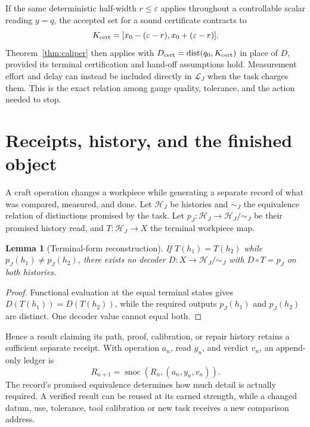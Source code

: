 \documentclass[11pt,letterpaper]{article}
\newtheorem{lemma}{Lemma}
\theoremstyle{definition}\newtheorem{definition}{Definition}
\newcommand{\Lag}{\mathscr L}
\newcommand{\dist}{\operatorname{dist}}
\newcommand{\snoc}{\operatorname{snoc}}
\begin{document}
If the same deterministic half-width $r\le\varepsilon$ applies throughout a controllable scalar reading $y=q$, the accepted set for a sound certificate contracts to
\[
K_{\rm cert}=[x_0-(\varepsilon-r),x_0+(\varepsilon-r)].
\]
Theorem~\ref{thm:caliper} then applies with $D_{\rm cert}=\dist(q_0,K_{\rm cert})$ in place of $D$, provided its terminal certification and hand-off assumptions hold. Measurement effort and delay can instead be included directly in $\Lag_J$ when the task charges them. This is the exact relation among gauge quality, tolerance, and the action needed to stop.

\section{Receipts, history, and the finished object}
A craft operation changes a workpiece while generating a separate record of what was compared, measured, and done. Let $\mathcal H_J$ be histories and $\sim_J$ the equivalence relation of distinctions promised by the task. Let $p_J:\mathcal H_J\to\mathcal H_J/\!\sim_J$ be their promised history read, and $T:\mathcal H_J\to X$ the terminal workpiece map.

\begin{lemma}[Terminal-form reconstruction]\label{lem:history}
If $T(h_1)=T(h_2)$ while $p_J(h_1)\ne p_J(h_2)$, there exists no decoder $D:X\to\mathcal H_J/\!\sim_J$ with $D\circ T=p_J$ on both histories.
\end{lemma}
\begin{proof}
Functional evaluation at the equal terminal states gives $D(T(h_1))=D(T(h_2))$, while the required outputs $p_J(h_1)$ and $p_J(h_2)$ are distinct. One decoder value cannot equal both.
\end{proof}

Hence a result claiming its path, proof, calibration, or repair history retains a sufficient separate receipt. With operation $a_n$, read $y_n$, and verdict $v_n$, an append-only ledger is
\begin{equation}\label{eq:snoc}
\boxed{R_{n+1}=\snoc(R_n,(a_n,y_n,v_n)).}
\end{equation}
The record's promised equivalence determines how much detail is actually required. A verified result can be reused at its earned strength, while a changed datum, use, tolerance, tool calibration or new task receives a new comparison address.
\end{document}
